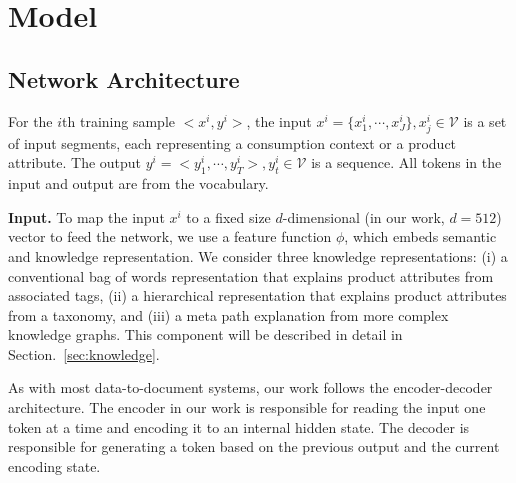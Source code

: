 \documentclass[sigconf]{acmart}
\begin{document}

\section{Model}\label{sec:model}

\subsection{Network Architecture}
For the $i$th training sample $<x^i,y^i>$, the input $x^i=\{x^i_1,\cdots,x^i_J\},x^i_j\in \mathcal{V}$ is a set of input segments, each representing a consumption context or a product attribute. The output $y^i=<y^i_1,\cdots,y^i_T>, y^i_t\in \mathcal{V}$ is a sequence. All tokens in the input and output are from the vocabulary.

\textbf{Input.} To map the input $x^i$ to a fixed size 
$d$-dimensional (in our work, $d=512$) vector to feed the network, we use a feature function $\phi$, which embeds semantic and knowledge representation. We consider three knowledge representations: (i)
a conventional bag of words representation that explains product attributes from associated tags, (ii) a
hierarchical representation that explains product attributes from a taxonomy, and (iii) a meta path explanation from more complex knowledge graphs. This component will be described in detail in Section.~\ref{sec:knowledge}.

As with most data-to-document systems, our work follows the encoder-decoder architecture. 
The encoder in our work is responsible for reading the input one token at a time and encoding it to an internal hidden state. The decoder is responsible for generating a token based on the previous output and the current encoding state.
\end{document}
